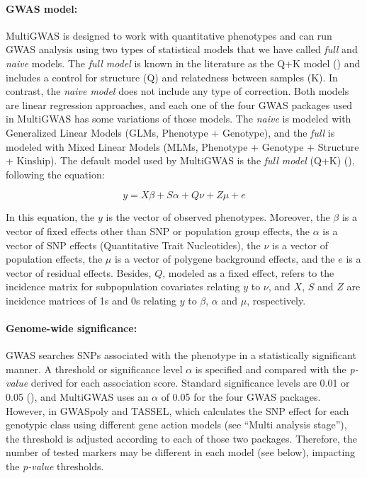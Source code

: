 \documentclass{article}
\begin{document}
\paragraph{GWAS model:}

MultiGWAS is designed to work with quantitative phenotypes and can run GWAS analysis using two types of statistical models that we have called \emph{full} and \emph{naive} models. The \emph{full model} is known in the literature as the Q+K model (\cite{Yu2006}) and includes a control for structure (Q) and relatedness between samples (K). In contrast, the \emph{naive model} does not include any type of correction. Both models are linear regression approaches, and each one of the four GWAS packages used in MultiGWAS has some variations of those models. The \emph{naive} is modeled with Generalized Linear Models (GLMs, Phenotype + Genotype), and the \emph{full} is modeled with Mixed Linear Models (MLMs, Phenotype + Genotype + Structure + Kinship). The default model used by MultiGWAS is the \emph{full model} (Q+K) (\cite{Yu2006}), following the equation:

\[
y=X\beta+S\alpha+Q\nu+Z\mu+e
\]

In this equation, the $y$ is the vector of observed phenotypes. Moreover, the $\beta$ is a vector of fixed effects other than SNP or population group effects, the $\alpha$ is a vector of SNP effects (Quantitative Trait Nucleotides), the $\nu$ is a vector of population effects, the $\mu$ is a vector of polygene background effects, and the $e$ is a vector of residual effects. Besides,  $Q$, modeled as a fixed effect, refers to the incidence matrix for subpopulation covariates relating $y$ to $\nu$, and $X$, $S$ and $Z$ are incidence matrices of 1s and 0s relating $y$ to $\beta$, $\alpha$ and $\mu$, respectively.


\paragraph{Genome-wide significance: }

GWAS searches SNPs associated with the phenotype in a statistically significant manner. A threshold or significance level $\alpha$ is specified and compared with the \emph{p-value} derived for each association score. Standard significance levels are 0.01 or 0.05 (\cite{Gumpinger2018,Rosyara2016}), and MultiGWAS uses an $\alpha$ of 0.05 for the four GWAS packages. However,  in GWASpoly and TASSEL, which calculates the SNP effect for each genotypic class using different gene action models (see ``Multi analysis stage''), the threshold is adjusted according to each of those two packages. Therefore, the number of tested markers\emph{ }may be different in each model (see below), impacting the \emph{p-value} thresholds.
\end{document}
